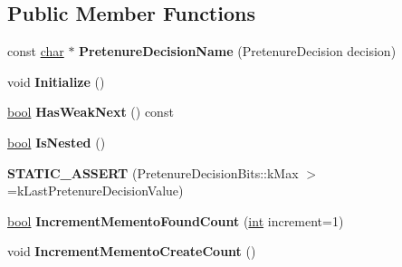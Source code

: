 \subsection*{Public Member Functions}
\begin{DoxyCompactItemize}
\item 
\mbox{\label{classv8_1_1internal_1_1AllocationSite_a015895d2a527877f98749eb13b16a38f}} 
const \mbox{\hyperlink{classchar}{char}} $\ast$ {\bfseries Pretenure\+Decision\+Name} (Pretenure\+Decision decision)
\item 
\mbox{\label{classv8_1_1internal_1_1AllocationSite_a81f61008e147366d1eea6cdbae9d5ded}} 
void {\bfseries Initialize} ()
\item 
\mbox{\label{classv8_1_1internal_1_1AllocationSite_a06e769d7ad11dc8f553f8cc989525b9a}} 
\mbox{\hyperlink{classbool}{bool}} {\bfseries Has\+Weak\+Next} () const
\item 
\mbox{\label{classv8_1_1internal_1_1AllocationSite_a46538baa1f709d8644d714e7f6bea60f}} 
\mbox{\hyperlink{classbool}{bool}} {\bfseries Is\+Nested} ()
\item 
\mbox{\label{classv8_1_1internal_1_1AllocationSite_ad1c0e4e32b7e2db1483fa7a518bec030}} 
{\bfseries S\+T\+A\+T\+I\+C\+\_\+\+A\+S\+S\+E\+RT} (Pretenure\+Decision\+Bits\+::k\+Max $>$=k\+Last\+Pretenure\+Decision\+Value)
\item 
\mbox{\label{classv8_1_1internal_1_1AllocationSite_ad402f0d78d12a670cf7eb371f65fc1c0}} 
\mbox{\hyperlink{classbool}{bool}} {\bfseries Increment\+Memento\+Found\+Count} (\mbox{\hyperlink{classint}{int}} increment=1)
\item 
\mbox{\label{classv8_1_1internal_1_1AllocationSite_ac32fcfb926ce03239f5df6aca880f18c}} 
void {\bfseries Increment\+Memento\+Create\+Count} ()
\item 
\mbox{\label{classv8_1_1internal_1_1AllocationSite_a3e2f845f0caa8c7a41cd958ae5c34757}} 

\end{DoxyCompactItemize}
